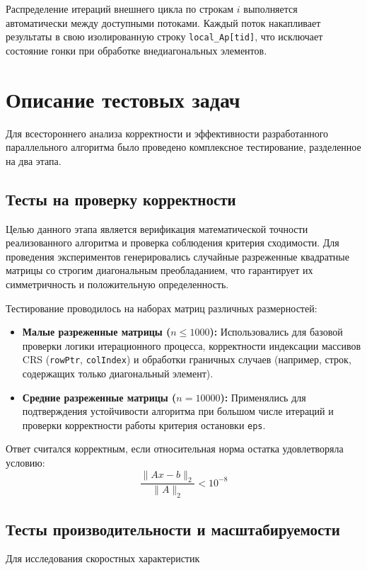 \documentclass[12pt, a4paper]{article}
\begin{document}
Распределение итераций внешнего цикла по строкам $i$ выполняется автоматически между доступными потоками. Каждый поток накапливает результаты в свою изолированную строку \texttt{local\_Ap[tid]}, что исключает состояние гонки при обработке внедиагональных элементов.


\section{Описание тестовых задач}
Для всестороннего анализа корректности и эффективности разработанного параллельного алгоритма было проведено комплексное тестирование, разделенное на два этапа.

\subsection{Тесты на проверку корректности}
Целью данного этапа является верификация математической точности реализованного алгоритма и проверка соблюдения критерия сходимости. Для проведения экспериментов генерировались случайные разреженные квадратные матрицы со строгим диагональным преобладанием, что гарантирует их симметричность и положительную определенность.

Тестирование проводилось на наборах матриц различных размерностей:
\begin{itemize}
    \item \textbf{Малые разреженные матрицы ($n \le 1000$):} Использовались для базовой проверки логики итерационного процесса, корректности индексации массивов CRS (\texttt{rowPtr}, \texttt{colIndex}) и обработки граничных случаев (например, строк, содержащих только диагональный элемент).
    \item \textbf{Средние разреженные матрицы ($n = 10000$):} Применялись для подтверждения устойчивости алгоритма при большом числе итераций и проверки корректности работы критерия остановки \texttt{eps}.
\end{itemize}
Ответ считался корректным, если относительная норма остатка удовлетворяла условию:
\begin{equation}
    \frac{\|Ax - b\|_2}{\|A\|_2} < 10^{-8}
\end{equation}

\subsection{Тесты производительности и масштабируемости}
Для исследования скоростных характеристик
\end{document}
